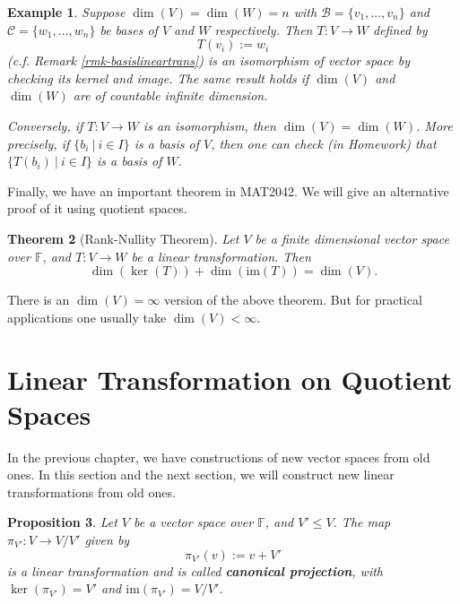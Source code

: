 \documentclass[12pt]{amsbook}
\newtheorem{theorem}{Theorem}[section]
\newtheorem{example}[theorem]{Example}
\newtheorem{proposition}[theorem]{Proposition}
\begin{document}
\begin{example} \label{eg-kerim}
Suppose $\dim(V) = \dim(W) = n$ with $\mathcal{B} = \{v_1, \dots, v_n\}$ and $\mathcal{C} = \{w_1, \dots, w_n\}$ be bases of $V$ and $W$ respectively. Then $T:V \to W$ defined by
$$T(v_i) := w_i$$
(c.f. Remark \ref{rmk-basislineartrans}) is an isomorphism of vector space by checking its kernel and image. The same result holds if $\dim(V)$ and $\dim(W)$ are of countable infinite dimension.

Conversely, if $T: V \to W$ is an isomorphism, then $\dim(V) = \dim(W)$. More precisely, if $\{b_i\ |\ i \in I\}$ is a basis of $V$, then one can check (in Homework) that $\{T(b_i)\ |\ i \in I\}$ is a basis of $W$. 
\end{example}

Finally, we have an important theorem in MAT2042. We will give an alternative proof of it using quotient spaces.
\begin{theorem}[Rank-Nullity Theorem] \label{thm-rn}
    Let $V$ be a finite dimensional vector space over $\mathbb{F}$, and $T:V \to W$ be a linear transformation. Then
    $$\dim(\ker(T)) + \dim(\mathrm{im}(T)) = \dim(V).$$
\end{theorem}
There is an $\dim(V) = \infty$ version of the above theorem. But for practical applications one usually take $\dim(V) < \infty$.

\section{Linear Transformation on Quotient Spaces}
In the previous chapter, we have constructions of new vector spaces from old ones. In this section and the next section, we will construct new linear transformations from old ones.
\begin{proposition}
    Let $V$ be a vector space over $\mathbb{F}$, and $V' \leq V$. The map $\pi_{V'}: V \to V/V'$ given by
    $$\pi_{V'}(v) := v + V'$$
    is a linear transformation and is called {\bf canonical projection}, with $\ker(\pi_{V'}) = V'$ and $\mathrm{im}(\pi_{V'})= V/V'$.
\end{proposition}
\end{document}

